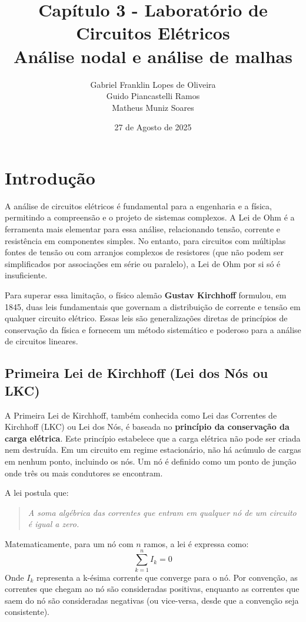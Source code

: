 \documentclass[a4paper, 12pt]{article}
\title{Capítulo 3 - Laboratório de Circuitos Elétricos \\ Análise nodal e análise de malhas}
\author{Gabriel Franklin Lopes de Oliveira \\
Guido Piancastelli Ramos \\
Matheus Muniz Soares
}
\date{27 de Agosto de 2025}
\begin{document}
\maketitle

\section{Introdução}

A análise de circuitos elétricos é fundamental para a engenharia e a física, permitindo a compreensão e o projeto de sistemas complexos. A Lei de Ohm é a ferramenta mais elementar para essa análise, relacionando tensão, corrente e resistência em componentes simples. No entanto, para circuitos com múltiplas fontes de tensão ou com arranjos complexos de resistores (que não podem ser simplificados por associações em série ou paralelo), a Lei de Ohm por si só é insuficiente.

Para superar essa limitação, o físico alemão \textbf{Gustav Kirchhoff} formulou, em 1845, duas leis fundamentais que governam a distribuição de corrente e tensão em qualquer circuito elétrico. Essas leis são generalizações diretas de princípios de conservação da física e fornecem um método sistemático e poderoso para a análise de circuitos lineares.

\subsection{Primeira Lei de Kirchhoff (Lei dos Nós ou LKC)}
A Primeira Lei de Kirchhoff, também conhecida como Lei das Correntes de Kirchhoff (LKC) ou Lei dos Nós, é baseada no \textbf{princípio da conservação da carga elétrica}. Este princípio estabelece que a carga elétrica não pode ser criada nem destruída. Em um circuito em regime estacionário, não há acúmulo de cargas em nenhum ponto, incluindo os nós. Um nó é definido como um ponto de junção onde três ou mais condutores se encontram.

A lei postula que:
\begin{quote}
\textit{A soma algébrica das correntes que entram em qualquer nó de um circuito é igual a zero.}
\end{quote}
Matematicamente, para um nó com $n$ ramos, a lei é expressa como:
\begin{equation}
\sum_{k=1}^{n} I_k = 0
\label{eq:lkc}
\end{equation}
Onde $I_k$ representa a k-ésima corrente que converge para o nó. Por convenção, as correntes que chegam ao nó são consideradas positivas, enquanto as correntes que saem do nó são consideradas negativas (ou vice-versa, desde que a convenção seja consistente).
\end{document}
